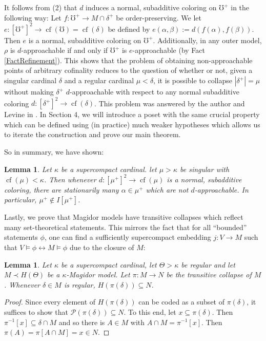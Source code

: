 \documentclass[a4paper]{amsart}
\theoremstyle{definition}
\theoremstyle{remark}
\theoremstyle{plain}
\newtheorem{mylem}[mydef]{Lemma}
\numberwithin{mydef}{section}
\DeclareMathOperator{\cf}{cf}
\begin{document}
	It follows from (2) that $d$ induces a normal, subadditive coloring on $\mho^+$ in the following way: Let $f\colon\mho^+\to M\cap\delta^+$ be order-preserving. We let $e\colon[\mho^+]^2\to\cf(\mho)=\cf(\delta)$ be defined by $e(\alpha,\beta):=d(f(\alpha),f(\beta))$. Then $e$ is a normal, subadditive coloring on $\mho^+$. Additionally, in any outer model, $\rho$ is $d$-approachable if and only if $\mho^+$ is $e$-approachable (by Fact \ref{FactRefinement}). This shows that the problem of obtaining non-approachable points of arbitrary cofinality reduces to the question of whether or not, given a singular cardinal $\delta$ and a regular cardinal $\mu<\delta$, it is possible to collapse $|\delta^+|=\mu$ without making $\delta^+$ $d$-approachable with respect to any normal subadditive coloring $d\colon[\delta^+]^2\to\cf(\delta)$. This problem was answered by the author and Levine in \cite{JakobLevineFailureApproachability}. In Section 4, we will introduce a poset with the same crucial property which can be defined using (in practice) much weaker hypotheses which allows us to iterate the construction and prove our main theorem.
	
	So in summary, we have shown:
	
	\begin{mylem}
		Let $\kappa$ be a supercompact cardinal. let $\mu>\kappa$ be singular with $\cf(\mu)<\kappa$. Then whenever $d\colon[\mu^+]^2\to\cf(\mu)$ is a normal, subadditive coloring, there are stationarily many $\alpha\in\mu^+$ which are not $d$-approachable. In particular, $\mu^+\notin I[\mu^+]$.
	\end{mylem}
	
	Lastly, we prove that Magidor models have transitive collapses which reflect many set-theoretical statements. This mirrors the fact that for all ``bounded'' statements $\phi$, one can find a sufficiently supercompact embedding $j\colon V\to M$ such that $V\models\phi\leftrightarrow M\models\phi$ due to the closure of $M$:
	
	\begin{mylem}\label{MagidorModelElementary}
		Let $\kappa$ be a supercompact cardinal, let $\Theta>\kappa$ be regular and let $M\prec H(\Theta)$ be a $\kappa$-Magidor model. Let $\pi\colon M\to N$ be the transitive collapse of $M$. Whenever $\delta\in M$ is regular, $H(\pi(\delta))\subseteq N$.
	\end{mylem}
	
	\begin{proof}
		Since every element of $H(\pi(\delta))$ can be coded as a subset of $\pi(\delta)$, it suffices to show that $\mathcal{P}(\pi(\delta))\subseteq N$. To this end, let $x\subseteq\pi(\delta)$. Then $\pi^{-1}[x]\subseteq\delta\cap M$ and so there is $A\in M$ with $A\cap M=\pi^{-1}[x]$. Then $\pi(A)=\pi[A\cap M]=x\in N$.
	\end{proof}
	
\end{document}

